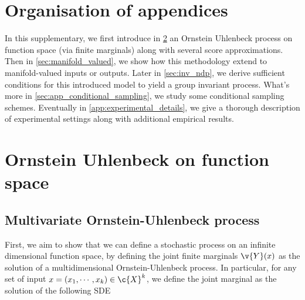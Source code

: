 
\section{Organisation of appendices}
\label{sec:organ_suppl}

In this supplementary, we first introduce in \cref{sec:continuous_process} an Ornstein Uhlenbeck process on function space (via finite marginals) along with several score approximations.
Then in \cref{sec:manifold_valued}, we show how this methodology extend to manifold-valued inputs or outputs.
Later in \cref{sec:inv_ndp}, we derive sufficient conditions for this introduced model to yield a group invariant process.
What's more in \cref{sec:app_conditional_sampling}, we study some conditional sampling schemes.
Eventually in \cref{app:experimental_details}, we give a thorough description of experimental settings along with additional empirical results.

\section{Ornstein Uhlenbeck on function space} \label{sec:continuous_process}

\subsection{Multivariate Ornstein-Uhlenbeck process}
\label{sec:multivariate_ou}

First, we aim to show that we can define a stochastic process on an infinite dimensional function space, by defining the joint finite marginals $\v{Y}(x)$ as the solution of a multidimensional Ornstein-Uhlenbeck process.
In particular, for any set of input $x = (x_1, \cdots, x_k) \in \c{X}^k$, we define the joint marginal as the solution of the following SDE \begin{equation}\label{eq:app_forward_SDE_sp} \end{equation} 


